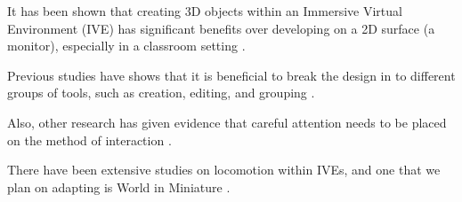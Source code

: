 It has been shown that creating 3D objects within an Immersive Virtual
Environment (IVE) has significant benefits over developing on a 2D surface (a
monitor)\cite{Kaufmann:Usability}, especially in a 
classroom setting \cite{Kaufmann:LearningGeometry}.

Previous studies have shows that it is beneficial to break the design in to
different groups of tools, such as creation, editing, and grouping
\cite{Butterworth:1992:3DM}.

Also, other research has given evidence that careful attention needs to be
placed on the method of interaction \cite{Bowman98interactiontechniques}.

There have been extensive studies on locomotion within IVEs, and one that we
plan on adapting is World in Miniature \cite{Pausch:WorldInMiniature}.
